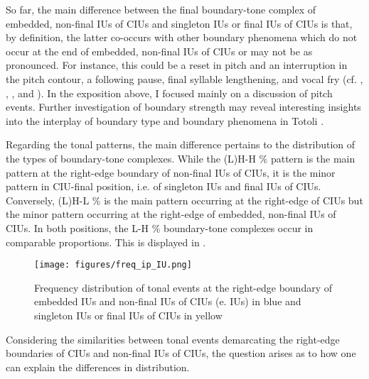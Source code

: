 So far, the main difference between the final boundary-tone complex of embedded, non-final IUs of CIUs and singleton IUs or final IUs of CIUs is that, by definition, the latter co-occurs with other boundary phenomena which do not occur at the end of embedded, non-final IUs of CIUs or may not be as pronounced. For instance, this could be a reset in pitch and an interruption in the pitch contour, a following pause, final syllable lengthening, and vocal fry (cf. \citealt[93--155]{Schuetze-Coburn1994}, \citealt[260--270]{himmelmann2006challenges}, \citealt{dubois1992, dubois1993}, and \citealt[29--39]{cruttenden1997intonation}). In the exposition above, I focused mainly on a discussion of pitch events. Further investigation of boundary strength may reveal interesting insights into the interplay of boundary type and boundary phenomena in Totoli \citep{schwiertz2009intonation, cho2005prosodic, fougeron1997articulatory}.




Regarding the tonal patterns, the main difference pertains to the distribution of the types of boundary-tone complexes. While the (L)H-H \% pattern is the main pattern at the right-edge boundary of non-final IUs of CIUs, it is the minor pattern in CIU-final position, i.e. of singleton IUs and final IUs of CIUs. Conversely, (L)H-L \% is the main pattern occurring at the right-edge of CIUs but the minor pattern occurring at the right-edge of embedded, non-final IUs of CIUs. In both positions, the L-H \% boundary-tone complexes occur in comparable proportions. This is displayed in .


\begin{figure}
	\texttt{[image: figures/freq\_ip\_IU.png]}
	\caption{Frequency distribution of tonal events at the right-edge boundary of embedded IUs and non-final IUs of CIUs (e. IUs) in blue and singleton IUs or final IUs of CIUs  in yellow}
	\label{Freq_ip_IU_type}
\end{figure}









Considering the similarities between tonal events demarcating the right-edge boundaries of CIUs and non-final IUs of CIUs, the question arises as to how one can explain the differences in distribution. 

